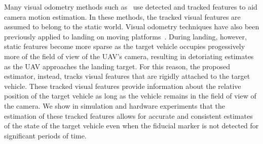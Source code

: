 Many visual odometry methods such
as~\cite{qin2018vins,leutenegger2013keyframe,mourikis2007multi,mur2015orb} use
detected and tracked features to aid camera motion estimation.
In these methods, the tracked visual features are assumed to belong to the
static world.
Visual odometry techniques
have also been previously applied to landing on
moving platforms~\cite{falanga2017vision}.
During landing, however, static features become more sparse as the target vehicle
occupies progessively more of the
field of view of the UAV's camera, resulting in detoriating
estimates as the UAV approaches the landing target.
For this reason, the proposed estimator, instead, tracks
visual features that are rigidly attached to the target vehicle. These tracked
visual features provide information about the relative position of the target
vehicle
as long as the vehicle remains in the field of view of the camera.
We show in simulation and hardware experiments that the estimation of these tracked features allows
for accurate and consistent estimates of the state of the target vehicle even
when the fiducial marker is not detected for significant periods of time.

